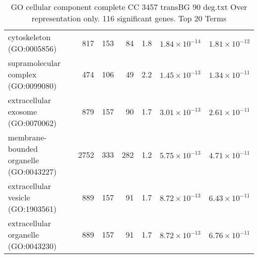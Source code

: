 \begin{table}[ht]
\begin{adjustbox}{width=\textwidth}
\begin{tabular}{lrrrrrr}
  cytoskeleton (GO:0005856) & 817 & 153 & 84 & 1.8 & $1.84 \times 10^{-14}$ & $1.81 \times 10^{-12}$ \\ 
  supramolecular complex (GO:0099080) & 474 & 106 & 49 & 2.2 & $1.45 \times 10^{-13}$ & $1.34 \times 10^{-11}$ \\ 
  extracellular exosome (GO:0070062) & 879 & 157 & 90 & 1.7 & $3.01 \times 10^{-13}$ & $2.61 \times 10^{-11}$ \\ 
  membrane-bounded organelle (GO:0043227) & 2752 & 333 & 282 & 1.2 & $5.75 \times 10^{-13}$ & $4.71 \times 10^{-11}$ \\ 
  extracellular vesicle (GO:1903561) & 889 & 157 & 91 & 1.7 & $8.72 \times 10^{-13}$ & $6.43 \times 10^{-11}$ \\ 
  extracellular organelle (GO:0043230) & 889 & 157 & 91 & 1.7 & $8.72 \times 10^{-13}$ & $6.76 \times 10^{-11}$ \\ 
   \hline
\end{tabular}
\end{adjustbox}
\caption{GO cellular component complete CC 3457 transBG 90 deg.txt Over representation only. 116 significant genes. Top 20 Terms} 
\label{tab:GO cellular component complete CC 3457 transBG 90 deg.txt Over representation only. 116 significant genes. Top 20 Terms}
\end{table}




